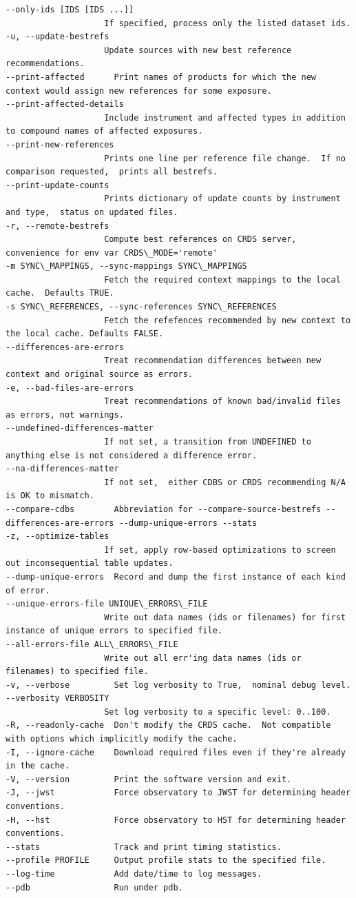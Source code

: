 \documentclass[letterpaper,10pt,english]{sphinxmanual}
\begin{document}
\begin{itemize}
\begin{Verbatim}[commandchars=\\\{\}]
--only-ids [IDS [IDS ...]]
                    If specified, process only the listed dataset ids.
-u, --update-bestrefs
                    Update sources with new best reference recommendations.
--print-affected      Print names of products for which the new context would assign new references for some exposure.
--print-affected-details
                    Include instrument and affected types in addition to compound names of affected exposures.
--print-new-references
                    Prints one line per reference file change.  If no comparison requested,  prints all bestrefs.
--print-update-counts
                    Prints dictionary of update counts by instrument and type,  status on updated files.
-r, --remote-bestrefs
                    Compute best references on CRDS server,  convenience for env var CRDS\_MODE='remote'
-m SYNC\_MAPPINGS, --sync-mappings SYNC\_MAPPINGS
                    Fetch the required context mappings to the local cache.  Defaults TRUE.
-s SYNC\_REFERENCES, --sync-references SYNC\_REFERENCES
                    Fetch the refefences recommended by new context to the local cache. Defaults FALSE.
--differences-are-errors
                    Treat recommendation differences between new context and original source as errors.
-e, --bad-files-are-errors
                    Treat recommendations of known bad/invalid files as errors, not warnings.
--undefined-differences-matter
                    If not set, a transition from UNDEFINED to anything else is not considered a difference error.
--na-differences-matter
                    If not set,  either CDBS or CRDS recommending N/A is OK to mismatch.
--compare-cdbs        Abbreviation for --compare-source-bestrefs --differences-are-errors --dump-unique-errors --stats
-z, --optimize-tables
                    If set, apply row-based optimizations to screen out inconsequential table updates.
--dump-unique-errors  Record and dump the first instance of each kind of error.
--unique-errors-file UNIQUE\_ERRORS\_FILE
                    Write out data names (ids or filenames) for first instance of unique errors to specified file.
--all-errors-file ALL\_ERRORS\_FILE
                    Write out all err'ing data names (ids or filenames) to specified file.
-v, --verbose         Set log verbosity to True,  nominal debug level.
--verbosity VERBOSITY
                    Set log verbosity to a specific level: 0..100.
-R, --readonly-cache  Don't modify the CRDS cache.  Not compatible with options which implicitly modify the cache.
-I, --ignore-cache    Download required files even if they're already in the cache.
-V, --version         Print the software version and exit.
-J, --jwst            Force observatory to JWST for determining header conventions.
-H, --hst             Force observatory to HST for determining header conventions.
--stats               Track and print timing statistics.
--profile PROFILE     Output profile stats to the specified file.
--log-time            Add date/time to log messages.
--pdb                 Run under pdb.
\end{Verbatim}

\end{itemize}
\end{document}
